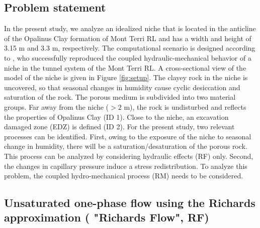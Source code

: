 \subsection{Problem statement}
In the present study, we analyze an idealized niche that is located in the anticline of the Opalinus Clay formation of Mont Terri RL and has a width and height of 3.15 m and 3.3 m, respectively. The computational scenario is designed according to \cite{ziefle2018}, who successfully reproduced the coupled hydraulic-mechanical behavior of a niche in the tunnel system of the Mont Terri RL.   A cross-sectional view of the model of the niche is given in Figure \ref{fig:setup}. The clayey rock in the niche is uncovered, so that seasonal changes in humidity cause cyclic desiccation and saturation of the rock. The porous medium is subdivided into two material groups. Far away from the niche ($> 2$ m), the rock is undisturbed and reflects the properties of Opalinus Clay (ID 1). Close to the niche, an excavation damaged zone (EDZ) is defined (ID 2). For the present study, two relevant processes can be identified. First, owing to the exposure of the niche to seasonal change in humidity, there will be a saturation/desaturation of the porous rock. This process can be analyzed by considering hydraulic effects (RF) only. Second, the changes in capillary pressure induce a stress redistribution. To analyze this problem, the coupled hydro-mechanical process (RM) needs to be considered.

\subsection{Unsaturated one-phase flow using the Richards approximation ( "Richards Flow", RF)}
\label{sec:RF}
